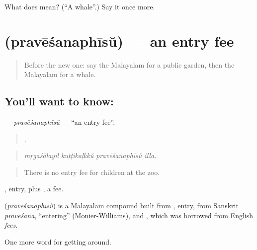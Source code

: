 \begin{tcolorbox}[breakable,colback=teal!4,colframe=teal!35!black,title={Before you move on}]
What does  mean? (\textquotedblleft{}A whale\textquotedblright{}.) Say it once more.
\end{tcolorbox}
\section[\texorpdfstring{\ml{പ്രവേശനഫീസ്} (pravēśanaphīsŭ)}{പ്രവേശനഫീസ് (pravēśanaphīsŭ)}]{ (pravēśanaphīsŭ) — an entry fee}

\label{lesson:ML-C501-pravesanaphisu}



\begin{quote}
Before the new one: say the Malayalam for a public garden, then the Malayalam for a whale.
\end{quote}

\subsection*{You'll want to know: }
\textbf{} — \emph{pravēśanaphīsŭ} — \textquotedblleft{}an entry fee\textquotedblright{}.

\begin{quote}
   .
\end{quote}

\begin{quote}
\emph{mṛgaśālayil kuṭṭikaḷkkŭ pravēśanaphīsŭ illa.}
\end{quote}

\begin{quote}
There is no entry fee for children at the zoo.
\end{quote}

, entry, plus , a fee.

\begin{cousinweb}
\textbf{} (\emph{pravēśanaphīsŭ}) is a Malayalam compound built from , entry, from Sanskrit \emph{praveśana}, \textquotedblleft{}entering\textquotedblright{} (Monier-Williams), and , which was borrowed from English \emph{fees}.
\end{cousinweb}

\begin{grammarlens}[title={What you've built}]
One more word for getting around.
\end{grammarlens}


